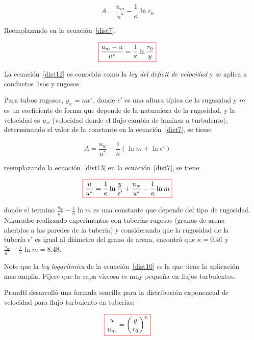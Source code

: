 \documentclass[11pt, oneside]{article}
\begin{document}
\begin{equation}
A = \frac{u_m}{u^*} - \frac{1}{\kappa} \ln r_0
\label{dist11}
\end{equation}

Reemplazando en la ecuaci\'on~\ref{dist7}:

\begin{equation}
\color{red}\boxed{\color{black} \frac{u_m-u}{u^*} = \frac{1}{\kappa} \ln \frac{r_0}{y} }
\label{dist12}
\end{equation}

La ecuaci\'on~\ref{dist12} es conocida como la \emph{ley del deficit de velocidad} y se aplica a conductos lisos y rugosos.

Para tubos rugosos, $y_w = m \epsilon '$, donde $\epsilon '$ es una altura t\'ipica de la rugosidad y $m$ es un coeficiente de forma que depende de la naturaleza de la rugosidad, y la velocidad es $u_w$ (velocidad donde el flujo cambia de laminar a turbulento), determinando el valor de la constante en la ecuaci\'on~\ref{dist7}, se tiene:
 
\begin{equation}
A = \frac{u_w}{u^*} - \frac{1}{\kappa} (\ln m + \ln \epsilon ')
\label{dist13}
\end{equation}

reemplazando la ecuaci\'on~\ref{dist13} en la ecuaci\'on~\ref{dist7}, se tiene:

\begin{equation}
\color{red}\boxed{\color{black} \frac{u}{u^*} = \frac{1}{\kappa}\ln \frac{y}{\epsilon '} + \frac{u_w}{u^*}-\frac{1}{\kappa}\ln m }
\label{dist14}
\end{equation}

donde el termino $\frac{u_w}{u^*}-\frac{1}{\kappa}\ln m$ es una constante que depende del tipo de rugosidad. Nikuradse realizando experimentos con tuber\'ias rugosas (granos de arena aheridos a las paredes de la tuber\'ia) y considerando que la rugosidad de la tuber\'ia $\epsilon '$ es igual al di\'ametro del grano de arena, encontr\'o que $\kappa = 0.40$ y $\frac{u_w}{u^*}-\frac{1}{\kappa}\ln m =8.48$. 

Note que la \emph{ley logar\'itmica} de la ecuaci\'on~\ref{dist10} es la que tiene la aplicaci\'on mas amplia. F\'ijese que la capa viscosa es muy peque\~na en flujos turbulentos.

Prandtl desarroll\'o una formula sencilla para la distribuci\'on exponencial de velocidad para flujo turbulento en tuber\'ias:

\begin{equation}
\color{red}\boxed{\color{black} \frac{u}{u_m } = \left( \frac{y}{r_0} \right)^n  }
\label{dist15}
\end{equation}
\end{document}
